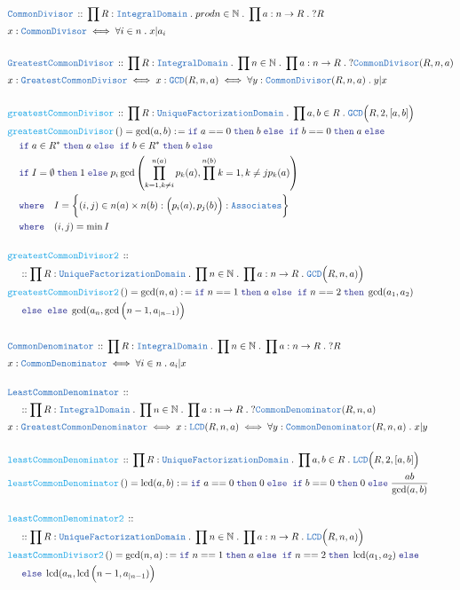 \documentclass[12pt]{scrartcl}
\newcommand{\TYPE}[1]{\textcolor{NavyBlue}{\mathtt{#1}}}
\newcommand{\FUNC}[1]{\textcolor{Cerulean}{\mathtt{#1}}}
\newcommand{\LOGIC}[1]{\textcolor{Blue}{\mathtt{#1}}}
\renewcommand{\.}{\; . \;}
\newcommand{\de}{: \kern 0.1pc =}
\newcommand{\where}{\LOGIC{where}}
\newcommand{\If}{\LOGIC{if} \;}
\newcommand{\Then}{ \; \LOGIC{then} \;}
\newcommand{\Else}{\; \LOGIC{else} \;}
\newcommand{\Act}[1]{\left( #1 \right)}
\newcommand{\DeclareType}[2]{& \TYPE{#1} \, :: \, #2 \\}
\newcommand{\DefineType}[3]{& #1 : \TYPE{#2} \iff #3 \\}
\newcommand{\DefineNamedType}[4]{& #1 : \TYPE{#2} \iff #3 \iff #4 \\}
\newcommand{\DeclareFunc}[2]{& \FUNC{#1} \, :: \, #2 \\}
\newcommand{\DefineNamedFunc}[4]{&  \FUNC{#1}\Act{#2} = #3 \de #4 \\}
\newcommand{\NewLine}{\\ & \kern 1pc}
\newcommand{\Page}[1]{ \begin{align*} #1 \end{align*}   }
\newcommand{\Nat}{\mathbb{N} }
\newcommand{\ID}{\TYPE{IntegralDomain}}
\newcommand{\UFD}{\TYPE{UniqueFactorizationDomain}}
\DeclareMathOperator{\lcd}{lcd}
\begin{document}
\Page{
	\DeclareType{CommonDivisor}{\prod R  : \ID \. prod n \in \Nat \. \prod a : n \to R \. ?R}
	\DefineType{x}{CommonDivisor}{\forall i \in n \. x | a_i} 
	\\
	\DeclareType{GreatestCommonDivisor}{ \prod R : \ID \. \prod n \in \Nat \. \prod a : n \to R \. ?\TYPE{CommonDivisor}(R,n,a) }
	\DefineNamedType{x}{GreatestCommonDivisor}{ x : \TYPE{GCD}(R,n,a) }{\forall y : \TYPE{CommonDivisor}(R,n,a) \. y | x}
	\\
	\DeclareFunc{greatestCommonDivisor}{ \prod R : \UFD \. \prod a,b \in R \. \TYPE{GCD}\Big(R,2,[a,b]\Big)}
	\DefineNamedFunc{greatestCommonDivisor}{ }{ \gcd(a,b) }{  \If a == 0 \Then b \Else \; \If b == 0 \Then a \Else \NewLine     
	    \If a \in R^* \Then a \Else \; \If b \in R^* \Then b \Else  \NewLine  	
	    \If I = \emptyset \Then 1  \Else  p_i \gcd \left(  \prod^{n(a)}_{k=1, k \neq i} p_k(a), \prod^{n(b)}{k=1,k\neq j} p_k(a) \right)
	    \NewLine   \where \quad I = \bigg\{  (i,j) \in n(a) \times n(b) : \Big(p_i(a),p_j(b)\Big)  : \TYPE{Associates}  \bigg\} 
	    \NewLine \where \quad (i,j) = \min I         
	}
	\\
	\DeclareFunc{greatestCommonDivisor2}{  \NewLine :: \prod R : \UFD \. \prod n \in \Nat \. \prod a : n \to R \. \TYPE{GCD}\Big(R,n,a)\Big)}
	\DefineNamedFunc{greatestCommonDivisor2}{}{\gcd(n,a)}{ \If n == 1 \Then a   \Else \; \If n == 2 \Then \gcd(a_1,a_2)  \NewLine \Else \Else \gcd(a_n, \gcd\Big(n-1, a_{|n-1}) \Big)  }
	\\
	\DeclareType{CommonDenominator}{\prod R  : \ID \. \prod n \in \Nat \. \prod a : n \to R \. ?R}
	\DefineType{x}{CommonDenominator}{\forall i \in n \. a_i | x} 
	\\
	\DeclareType{LeastCommonDenominator}{  \NewLine :: \prod R : \ID \. \prod n \in \Nat \. \prod a : n \to R \. ?\TYPE{CommonDenominator}(R,n,a) }
	\DefineNamedType{x}{GreatestCommonDenominator}{ x : \TYPE{LCD}(R,n,a) }{\forall y : \TYPE{CommonDenominator}(R,n,a) \. x | y}
	\\
	\DeclareFunc{leastCommonDenominator}{ \prod R : \UFD \. \prod a,b \in R \. \TYPE{LCD}\Big(R,2,[a,b]\Big)}
	\DefineNamedFunc{leastCommonDenominator}{ }{ \lcd(a,b) }{  \If a == 0 \Then 0 \Else \; \If b == 0 \Then 0 \Else \frac{ab}{\gcd(a,b)} }
	\\
	\DeclareFunc{leastCommonDenominator2}{ \NewLine :: \prod R : \UFD \. \prod n \in \Nat \. \prod a : n \to R \. \TYPE{LCD}\Big(R,n,a)\Big)}
	\DefineNamedFunc{leastCommonDivisor2}{}{\gcd(n,a)}{ \If n == 1 \Then a   \Else \; \If n == 2 \Then \lcd(a_1,a_2) \Else \NewLine \Else \lcd(a_n, \lcd\Big(n-1, a_{|n-1}) \Big)  }                      
}
\newpage
\end{document}
